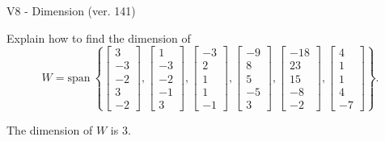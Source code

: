 \begin{exercise}
  \begin{exerciseTitle}V8 - Dimension (ver. 141)\end{exerciseTitle}
  \begin{exerciseStatement}
    Explain how to find the dimension of 
\[W=\mathrm{span}\ \left\{\left[\begin{array}{r}
3 \\
-3 \\
-2 \\
3 \\
-2
\end{array}\right] , \left[\begin{array}{r}
1 \\
-3 \\
-2 \\
-1 \\
3
\end{array}\right] , \left[\begin{array}{r}
-3 \\
2 \\
1 \\
1 \\
-1
\end{array}\right] , \left[\begin{array}{r}
-9 \\
8 \\
5 \\
-5 \\
3
\end{array}\right] , \left[\begin{array}{r}
-18 \\
23 \\
15 \\
-8 \\
-2
\end{array}\right] , \left[\begin{array}{r}
4 \\
1 \\
1 \\
4 \\
-7
\end{array}\right]\right\}.\]



  \end{exerciseStatement}
  \begin{exerciseAnswer}
   The dimension of \(W\) is  \(3\).
  


  \end{exerciseAnswer}
\end{exercise}
